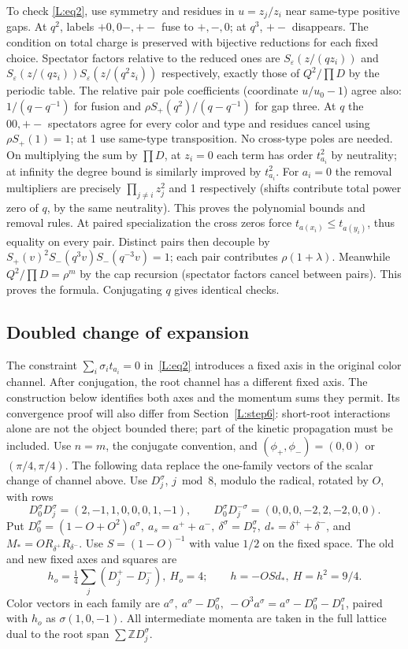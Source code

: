 \documentclass[11pt]{article}
\numberwithin{equation}{section}
\theoremstyle{definition}\newtheorem{definition}[theorem]{Definition}
\theoremstyle{remark}\newtheorem{remark}[theorem]{Remark}
\begin{document}
To check \eqref{L:eq2}, use symmetry and residues in \(u=z_j/z_i\) near same-type positive gaps. At \(q^2\), labels \(+0,0-,+-\) fuse to \(+, -,0\); at \(q^3\), \(+-\) disappears. The condition on total charge is preserved with bijective reductions for each fixed choice. Spectator factors relative to the reduced ones are \(S_\varepsilon(z/(qz_i))\) and \(S_\varepsilon(z/(qz_i))S_\varepsilon(z/(q^2z_i))\) respectively, exactly those of \(Q^2/\prod D\) by the periodic table. The relative pair pole coefficients (coordinate \(u/u_0-1\)) agree also: \(1/(q-q^{-1})\) for fusion and \(\rho S_+(q^2)/(q-q^{-1})\) for gap three. At \(q\) the \(00,+-\) spectators agree for every color and type and residues cancel using \(\rho S_+(1)=1\); at 1 use same-type transposition. No cross-type poles are needed. On multiplying the sum by \(\prod D\), at \(z_i=0\) each term has order \(t_{a_i}^2\) by neutrality; at infinity the degree bound is similarly improved by \(t_{a_i}^2\). For \(a_i=0\) the removal multipliers are precisely \(\prod_{j\ne i}z_j^2\) and 1 respectively (shifts contribute total power zero of \(q\), by the same neutrality). This proves the polynomial bounds and removal rules. At paired specialization the cross zeros force \(t_{a(x_i)}\le t_{a(y_i)}\), thus equality on every pair. Distinct pairs then decouple by \(S_+(v)^2 S_-(q^3v)S_-(q^{-3}v)=1\); each pair contributes \(\rho(1+\lambda)\). Meanwhile \(Q^2/\prod D=\rho^m\) by the cap recursion (spectator factors cancel between pairs). This proves the formula. Conjugating \(q\) gives identical checks.

\subsection{Doubled change of expansion}\label{L:step10}

The constraint $\sum_i\sigma_i t_{a_i}=0$ in~\eqref{L:eq2}
introduces a fixed axis in the original color channel. After conjugation,
the root channel has a different fixed axis. The construction below
identifies both axes and the momentum sums they permit. Its convergence
proof will also differ from Section~\ref{L:step6}: short-root interactions
alone are not the object bounded there; part of the kinetic propagation
must be included. Use \(n=m\), the conjugate convention, and \((\phi_+,\phi_-)=(0,0)\) or \((\pi/4,\pi/4)\). The following data replace the one-family vectors of the scalar change of channel above. Use \(D_j^\sigma\), \(j\bmod8\), modulo the radical, rotated by \(O\), with rows
\[
 D_0^\sigma D_j^\sigma=(2,-1,1,0,0,0,1,-1),\qquad
 D_0^\sigma D_j^{-\sigma}=(0,0,0,-2,2,-2,0,0).
\]
Put \(D_0^\sigma=(1-O+O^2)a^\sigma,\ a_s=a^++a^-,\ \delta^\sigma=D_7^\sigma,\ d_*=\delta^++\delta^-\), and \(M_*=O R_{\delta^+}R_{\delta^-}\). Use \(S=(1-O)^{-1}\) with value \(1/2\) on the fixed space. The old and new fixed axes and squares are
\[
 h_o=\tfrac14\sum_j(D_j^+-D_j^-),\ H_o=4;\qquad h=-OS d_*,\ H=h^2=9/4.
\]
Color vectors in each family are \(a^\sigma,\ a^\sigma-D_0^\sigma,\ -O^3 a^\sigma=a^\sigma-D_0^\sigma-D_1^\sigma\), paired with \(h_o\) as \(\sigma(1,0,-1)\). All intermediate momenta are taken in the full lattice dual to the root span \(\sum\mathbb ZD_j^\sigma\).
\end{document}
